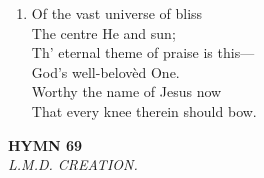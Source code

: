 \documentclass[11pt,a4paper]{article}
\begin{document}
\begin{enumerate}
    \item Of the vast universe of bliss \\
        The centre He and sun; \\
        Th' eternal theme of praise is this--- \\
        God's well-belov\`ed One. \\
        Worthy the name of Jesus now \\
        That every knee therein should bow.

\end{enumerate}

\newpage
\begin{center}
    {\Large \textbf{HYMN 69}}
    \\
    \textit{L.M.D. CREATION.}
\end{center}
\vspace{1em}
\end{document}
